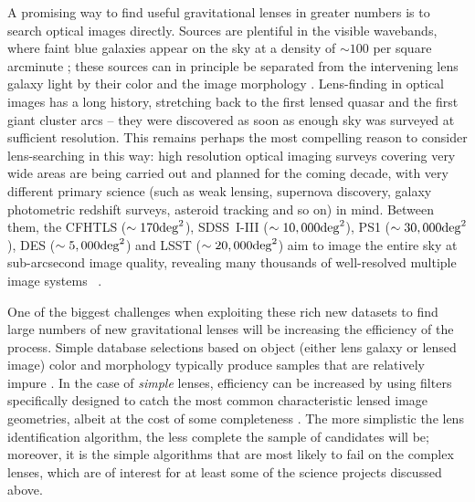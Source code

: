 \documentclass[iop]{emulateapj}
\def\sqdeg{{\rm deg}^{2}}
\def\eg{{\it e.g.}\,}
\begin{document}
A promising way to find useful gravitational lenses in greater numbers is to
search optical images directly. Sources are plentiful in the visible wavebands,
where faint blue galaxies appear on the sky at a density  of $\sim 100$ per
square arcminute \citep[\eg]{Ben++04}; these sources can in principle be
separated from the intervening lens galaxy light by their color and the image
morphology \citep[see \eg][]{Mou++07,Cab++07,Fau++08,Hen++08,Jac08,Mar++09}. 
Lens-finding in optical images has a long history, stretching back to the first
lensed quasar \citep{WCW79} and the first giant cluster arcs \citep{For87} --
they were discovered as soon as enough sky was surveyed at sufficient
resolution. This remains perhaps the most compelling reason to consider
lens-searching in this way: high resolution optical imaging surveys covering
very wide areas are being carried out and planned for the coming decade, with
very different primary science (such as weak lensing, supernova discovery,
galaxy photometric redshift surveys, asteroid tracking and so on) in mind.
Between them, the 
CFHTLS ($\sim 170 \sqdeg$), %
SDSS~I-III  ($\sim 10,000 \sqdeg$), %
PS1 ($\sim30,000 \sqdeg$), %
DES  ($\sim 5,000 \sqdeg$) %
and LSST ($\sim20,000 \sqdeg$) %
aim to image the entire sky at sub-arcsecond image quality, revealing
many thousands of well-resolved multiple image 
systems~ \citep[see \eg][]{Ogu++10,LSSTScienceBook}.

One of the biggest challenges when exploiting these rich new datasets  to find
large numbers of new gravitational lenses will be increasing the efficiency of
the process.  Simple database selections based on object (either lens galaxy or
lensed image) color and morphology typically produce samples that are relatively
impure \citep{All++07,Hen++08,Fau++08}. In the case of {\it simple}  lenses,
efficiency can be increased by using filters specifically designed to catch the
most common characteristic lensed image geometries, albeit at the cost of some
completeness \citep{Mar++09,Kub++09}. The more simplistic the lens
identification algorithm, the less complete the sample of candidates will be;
moreover, it is the simple algorithms that are most likely to fail on the
complex lenses, which are of interest for at least some of the science
projects discussed above. 
\end{document}
